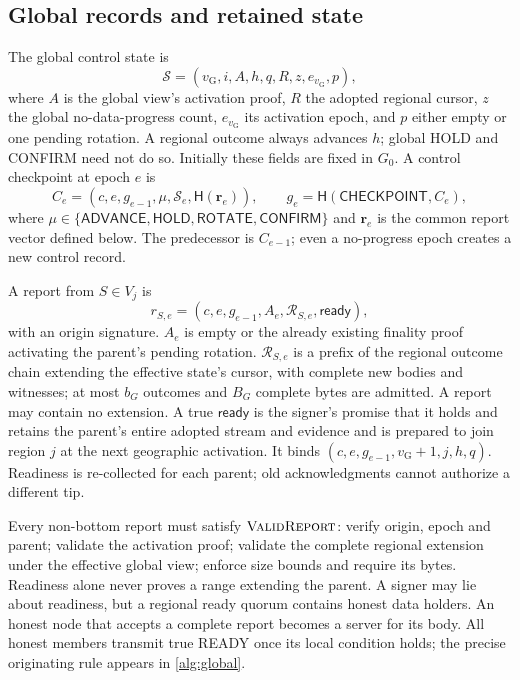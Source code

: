 \documentclass[11pt,a4paper,onecolumn]{article}
\newcommand{\Hash}{\mathsf H}
\newcommand{\gv}{v_{\mathrm G}}
\newcommand{\Tag}[1]{\mathsf{#1}}
\newcommand{\Proc}[1]{\textnormal{\textsc{#1}}}
\theoremstyle{remark}\newtheorem{example}[definition]{Example}
\begin{document}
\subsection{Global records and retained state}\label{sec:gobjects}
The global control state is
\[
 \mathcal S=(\gv,i,A,h,q,R,z,e_{\gv},p),
\]
where $A$ is the global view's activation proof, $R$ the adopted regional cursor,
$z$ the global no-data-progress count, $e_{\gv}$ its activation epoch, and $p$ either
empty or one pending rotation. A regional outcome always advances $h$; global
HOLD and CONFIRM need not do so. Initially these fields are fixed in $G_0$.
A control checkpoint at epoch $e$ is
\begin{equation}\label{eq:global}
 C_e=(c,e,g_{e-1},\mu,\mathcal S_e,\Hash(\mathbf r_e)),\qquad
 g_e=\Hash(\Tag{CHECKPOINT},C_e),
\end{equation}
where $\mu\in\{\Tag{ADVANCE},\Tag{HOLD},\Tag{ROTATE},\Tag{CONFIRM}\}$ and
$\mathbf r_e$ is the common report vector defined below. The predecessor is
$C_{e-1}$; even a no-progress epoch creates a new control record.

A report from $S\in V_j$ is
\[
 r_{S,e}=(c,e,g_{e-1},A_e,\mathcal R_{S,e},\mathsf{ready}),
\]
with an origin signature. $A_e$ is empty or the already existing finality proof
activating the parent's pending rotation. $\mathcal R_{S,e}$ is a prefix of the
regional outcome chain extending the effective state's cursor, with complete
new bodies and witnesses; at most $b_G$ outcomes and $B_G$ complete bytes are
admitted. A report may contain no extension. A true $\mathsf{ready}$ is the
signer's promise that it holds and retains the parent's entire adopted stream
and evidence and is prepared to join region $j$ at the next geographic
activation. It binds $(c,e,g_{e-1},\gv+1,j,h,q)$. Readiness is re-collected for each
parent; old acknowledgments cannot authorize a different tip.

Every non-bottom report must satisfy $\Proc{ValidReport}$: verify origin,
epoch and parent; validate the activation proof; validate the complete regional
extension under the effective global view; enforce size bounds and require its
bytes. Readiness alone never proves a range extending the parent. A signer may
lie about readiness, but a regional ready quorum contains honest data holders.
An honest node that accepts a complete report becomes a server for its body.
All honest members transmit true READY once its local condition holds; the
precise originating rule appears in \cref{alg:global}.
\end{document}
